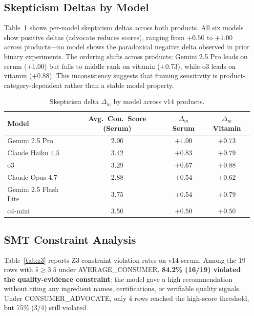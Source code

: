 \documentclass[11pt]{article}
\begin{document}
\subsection{Skepticism Deltas by Model}

Table~\ref{tab:delta} shows per-model skepticism deltas across both products. All six models show positive deltas (advocate reduces scores), ranging from $+0.50$ to $+1.00$ across products---no model shows the paradoxical negative delta observed in prior binary experiments. The ordering shifts across products: Gemini 2.5 Pro leads on serum ($+1.00$) but falls to middle rank on vitamin ($+0.73$), while o3 leads on vitamin ($+0.88$). This inconsistency suggests that framing sensitivity is product-category-dependent rather than a stable model property.

\begin{table}[H]
\centering\small\vspace{-4pt}
\caption{Skepticism delta $\Delta_m$ by model across v14 products.}\label{tab:delta}
\begin{tabular}{@{}lccc@{}}
\toprule
\textbf{Model} & \textbf{Avg.~Con.~Score (Serum)} & \textbf{$\Delta_m$ Serum} & \textbf{$\Delta_m$ Vitamin} \\
\midrule
Gemini 2.5 Pro        & 2.00 & $+1.00$ & $+0.73$ \\
Claude Haiku 4.5      & 3.42 & $+0.83$ & $+0.79$ \\
o3                    & 3.29 & $+0.67$ & $+0.88$ \\
Claude Opus 4.7       & 2.88 & $+0.54$ & $+0.62$ \\
Gemini 2.5 Flash Lite & 3.75 & $+0.54$ & $+0.79$ \\
o4-mini               & 3.50 & $+0.50$ & $+0.50$ \\
\bottomrule
\end{tabular}
\vspace{-4pt}
\end{table}

\subsection{SMT Constraint Analysis}

Table~\ref{tab:z3} reports Z3 constraint violation rates on v14-serum. Among the 19 rows with $\hat{s} \geq 3.5$ under AVERAGE\_CONSUMER, \textbf{84.2\% (16/19) violated the quality-evidence constraint}: the model gave a high recommendation without citing any ingredient names, certifications, or verifiable quality signals. Under CONSUMER\_ADVOCATE, only 4 rows reached the high-score threshold, but 75\% (3/4) still violated.
\end{document}
